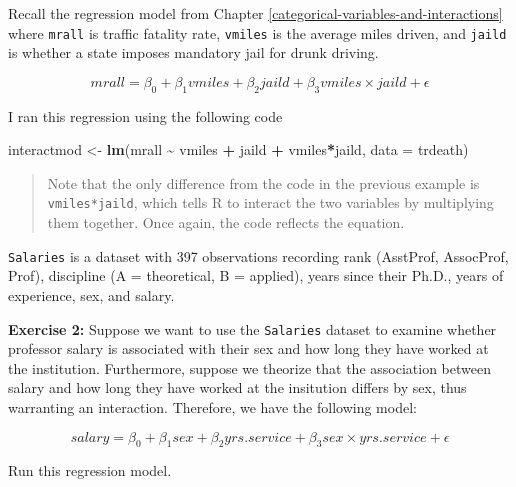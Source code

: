 \documentclass[
]{book}
\makeatletter
\newenvironment{Shaded}{\begin{snugshade}}{\end{snugshade}}
\newcommand{\AttributeTok}[1]{\textcolor[rgb]{0.27,0.27,0.27}{#1}}
\newcommand{\FunctionTok}[1]{\textcolor[rgb]{0.27,0.27,0.27}{\textbf{#1}}}
\newcommand{\NormalTok}[1]{#1}
\newcommand{\OtherTok}[1]{\textcolor[rgb]{0.37,0.37,0.37}{#1}}
\newcommand{\SpecialCharTok}[1]{\textcolor[rgb]{0.43,0.43,0.43}{\textbf{#1}}}
\newenvironment{kframe}{%
\medskip{}
\setlength{\fboxsep}{.8em}
 \def\at@end@of@kframe{}%
 \ifinner\ifhmode%
  \def\at@end@of@kframe{\end{minipage}}%
  \begin{minipage}{\columnwidth}%
 \fi\fi%
 \def\FrameCommand##1{\hskip\@totalleftmargin \hskip-\fboxsep
 \colorbox{shadecolor}{##1}\hskip-\fboxsep
     \hskip-\linewidth \hskip-\@totalleftmargin \hskip\columnwidth}%
 \MakeFramed {\advance\hsize-\width
   \@totalleftmargin\z@ \linewidth\hsize
   \@setminipage}}%
 {\par\unskip\endMakeFramed%
 \at@end@of@kframe}
\renewenvironment{Shaded}{\begin{kframe}}{\end{kframe}}
\newenvironment{rmdblock}[1]
  {\begin{shaded*}
  }
  {\end{shaded*}
  }
\newenvironment{learncheck}
  {\begin{rmdblock}{warning}}
  {\end{rmdblock}}
\makeatother
\begin{document}
Recall the regression model from Chapter \ref{categorical-variables-and-interactions} where \texttt{mrall} is traffic fatality rate, \texttt{vmiles} is the average miles driven, and \texttt{jaild} is whether a state imposes mandatory jail for drunk driving.

\begin{equation}
mrall = \beta_0 + \beta_1 vmiles + \beta_2 jaild + \beta_3 vmiles \times jaild + \epsilon
\end{equation}

I ran this regression using the following code

\begin{Shaded}
\begin{Highlighting}[]
\NormalTok{interactmod }\OtherTok{\textless{}{-}} \FunctionTok{lm}\NormalTok{(mrall }\SpecialCharTok{\textasciitilde{}}\NormalTok{ vmiles }\SpecialCharTok{+}\NormalTok{ jaild }\SpecialCharTok{+}\NormalTok{ vmiles}\SpecialCharTok{*}\NormalTok{jaild, }\AttributeTok{data =}\NormalTok{ trdeath)}
\end{Highlighting}
\end{Shaded}

\begin{quote}
Note that the only difference from the code in the previous example is \texttt{vmiles*jaild}, which tells R to interact the two variables by multiplying them together. Once again, the code reflects the equation.
\end{quote}

\texttt{Salaries} is a dataset with 397 observations recording rank (AsstProf, AssocProf, Prof), discipline (A = theoretical, B = applied), years since their Ph.D., years of experience, sex, and salary.

\begin{learncheck}
\textbf{Exercise 2:} Suppose we want to use the \texttt{Salaries}
dataset to examine whether professor salary is associated with their sex
and how long they have worked at the institution. Furthermore, suppose
we theorize that the association between salary and how long they have
worked at the insitution differs by sex, thus warranting an interaction.
Therefore, we have the following model:

\begin{equation}
salary = \beta_0 + \beta_1sex + \beta_2yrs.service + \beta_3 sex \times yrs.service + \epsilon
\end{equation}

Run this regression model.
\end{learncheck}
\end{document}
